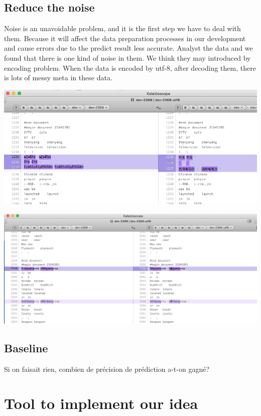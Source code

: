 \documentclass[a4paper]{article}
\begin{document}
\subsection{Reduce the noise}
Noise is an unavoidable problem, and it is the first step we have to deal with them. Because it will affect the data preparation processes in our development and cause errors due to the predict result less accurate.
Analyst the data and we found that there is one kind of noise in them. We think they may introduced by encoding problem. When the data is encoded by utf-8, after decoding them, there is lots of messy meta in these data. 

\includegraphics[width=1\textwidth]{noise1.png}

\includegraphics[width=1\textwidth]{noise2.png}

\subsection{Baseline}
Si on faisait rien, combien de précision de prédiction a-t-on gagné? 

\section{Tool to implement our idea}
\end{document}
